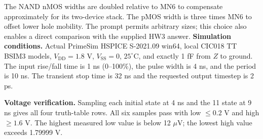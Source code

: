 \documentclass[11pt,a4paper]{article}
\newcommand{\VDD}{V_{\mathrm{DD}}}
\newcommand{\VSS}{V_{\mathrm{SS}}}
\begin{document}
The NAND nMOS widths are doubled relative to MN6 to compensate approximately for its two-device stack. The pMOS width is three times MN6 to offset lower hole mobility. The prompt permits arbitrary sizes; this choice also enables a direct comparison with the supplied HW3 answer.
\textbf{Simulation conditions.} Actual PrimeSim HSPICE S-2021.09 win64, local CIC018 TT BSIM3 models, $\VDD=1.8$ V, $\VSS=0$, $25^\circ$C, and exactly 1 fF from $Z$ to ground. The input rise/fall time is 1 ns (0--100\%), the pulse width is 4 ns, and the period is 10 ns. The transient stop time is 32 ns and the requested output timestep is 2 ps.

\textbf{Voltage verification.} Sampling each initial state at 4 ns and the 11 state at 9 ns gives all four truth-table rows. All six samples pass with low $\le0.2$ V and high $\ge1.6$ V. The highest measured low value is below 12 $\mu$V; the lowest high value exceeds 1.79999 V.
\newpage
\end{document}
